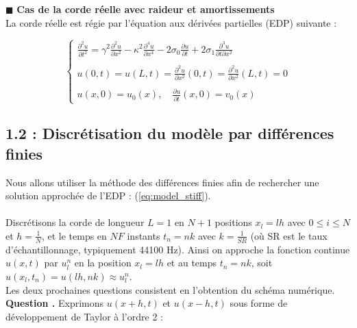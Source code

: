 \documentclass[a4,12pt]{article}
\newcounter{Nbquestion}
\newcommand*\question{%
\stepcounter{Nbquestion}%
\textbf{Question \theNbquestion. }}
\begin{document}

\indent $\blacksquare$ \textbf{Cas de la corde réelle avec raideur et amortissements}\\

La corde réelle est régie par l'équation aux dérivées partielles (EDP) suivante :

\begin{equation} 
  \left\{
    \begin{array}{l}
      \displaystyle \frac{\partial^2 u}{\partial t^2}=\gamma^2 \frac{\partial^2 u}{\partial x^2}-\kappa^2  				\frac{\partial^4 u}{\partial x^4}-2\sigma_0  \frac{\partial u}{\partial t}+2\sigma_1  \frac{\partial^3 u}{\partial t		\partial x^2}\\ \\ 
      \displaystyle u(0,t)=u(L,t)=\frac{\partial^2 u}{\partial x^2}(0,t)=\frac{\partial^2 u}{\partial x^2}(L,t)=0\\ \\  		\displaystyle u(x,0)=u_0(x), \quad \frac{\partial u}{\partial t}(x,0)=v_0(x)
    \end{array}
    \right. 
    \label{eq:model_stiff}
  \end{equation}

  \subsection*{1.2 : Discrétisation du modèle par différences finies}

  Nous allons utiliser la méthode des différences finies afin de rechercher une solution approchée de l'EDP : (\ref{eq:model_stiff}).\\\\
  Discrétisons la corde de longueur $L=1$ en $N+1$ positions $x_l=lh$ avec $0\leqslant i\leqslant N$ et $h=\frac{1}{N}$, et le temps en $NF$ instants $t_n=nk$ avec $k=\frac{1}{SR}$ (où SR est le taux d'échantillonnage, typiquement 44100 Hz). Ainsi on approche la fonction continue $u(x,t)$ par $u_l^n$ en la position $x_l=lh$ et au temps $t_n=nk$, soit $u(x_l,t_n)=u(lh,nk)\approx u_l^n$. \\

  Les deux prochaines questions consistent en l'obtention du schéma numérique.\\


  \question Exprimons $u(x+h,t)$ et $u(x-h,t)$ sous forme de développement de Taylor à l'ordre 2 :
\end{document}

